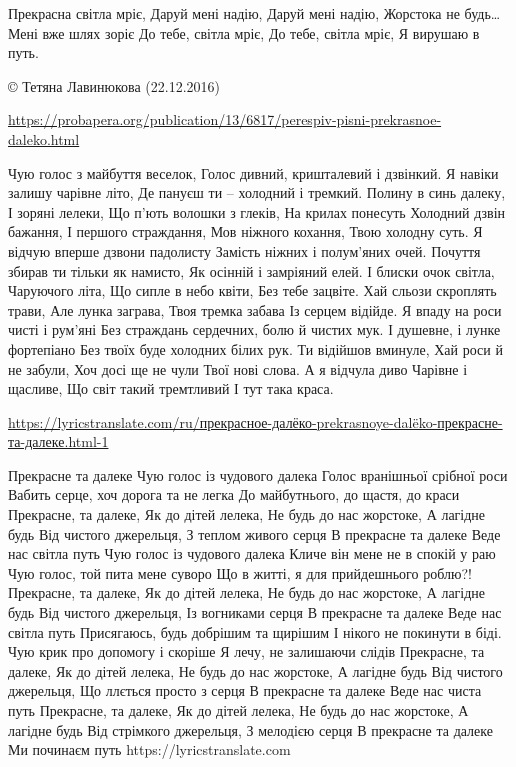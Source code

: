 Прекрасна світла мріє,
Даруй мені надію,
Даруй мені надію,
Жорстока не будь…
Мені вже шлях зоріє
До тебе, світла мріє,
До тебе, світла мріє,
Я вирушаю в путь.

© Тетяна Лавинюкова  
(22.12.2016) 

\url{https://probapera.org/publication/13/6817/perespiv-pisni-prekrasnoe-daleko.html}

Чую голос з майбуття веселок, 
Голос дивний, кришталевий і дзвінкий. 
Я навіки залишу чарівне літо, 
Де пануєш ти – холодний і тремкий. 
Полину в синь далеку, 
І зоряні лелеки, 
Що п’ють волошки з глеків, 
На крилах понесуть 
Холодний дзвін бажання, 
І першого страждання, 
Мов ніжного кохання, 
Твою холодну суть. 
Я відчую вперше дзвони падолисту 
Замість ніжних і полум’яних очей. 
Почуття збирав ти тільки як намисто, 
Як осінній і замріяний елей. 
І блиски очок світла, 
Чаруючого літа, 
Що сипле в небо квіти, 
Без тебе зацвіте. 
Хай сльози скроплять трави, 
Але лунка заграва, 
Твоя тремка забава 
Із серцем відійде. 
Я впаду на роси чисті і рум’яні 
Без страждань сердечних, болю й чистих мук.  
І душевне, і лунке фортепіано 
Без твоїх буде холодних білих рук. 
Ти відійшов вминуле, 
Хай роси й не забули, 
Хоч досі ще не чули 
Твої нові слова. 
А я відчула диво 
Чарівне і щасливе, 
Що світ такий тремтливий  
І тут така краса. 

\url{https://lyricstranslate.com/ru/прекрасное-далёко-prekrasnoye-dalëko-прекрасне-та-далеке.html-1}

Прекрасне та далеке
Чую голос із чудового далека
Голос вранішньої срібної роси
Вабить серце, хоч дорога та не легка
До майбутнього, до щастя, до краси
Прекрасне, та далеке,
Як до дітей лелека,
Не будь до нас жорстоке,
А лагідне будь
Від чистого джерельця,
З теплом живого серця
В прекрасне та далеке
Веде нас світла путь
Чую голос із чудового далека
Кличе він мене не в спокій у раю
Чую голос, той пита мене суворо
Що в житті, я для прийдешнього роблю?!
Прекрасне, та далеке,
Як до дітей лелека,
Не будь до нас жорстоке,
А лагідне будь
Від чистого джерельця,
Із вогниками серця
В прекрасне та далеке
Веде нас світла путь
Присягаюсь, будь добрішим та щирішим
І нікого не покинути в біді.
Чую крик про допомогу і скоріше
Я лечу, не залишаючи слідів
Прекрасне, та далеке,
Як до дітей лелека,
Не будь до нас жорстоке,
А лагідне будь
Від чистого джерельця,
Що ллється просто з серця
В прекрасне та далеке
Веде нас чиста путь
Прекрасне, та далеке,
Як до дітей лелека,
Не будь до нас жорстоке,
А лагідне будь
Від стрімкого джерельця,
З мелодією серця
В прекрасне та далеке
Ми починаєм путь
https://lyricstranslate.com
